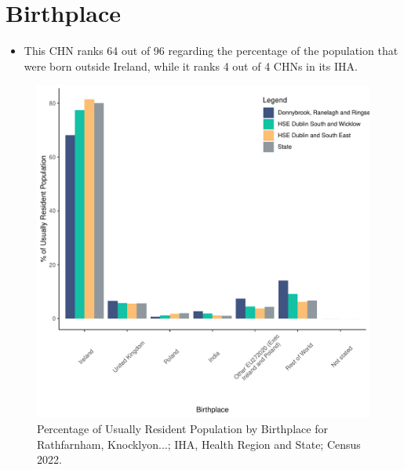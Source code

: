 \documentclass{article}
\begin{document}
\section{Birthplace}\label{sect:Birth}
\begin{itemize}
\item This CHN ranks  64 out of 96 regarding the percentage of the population that were born outside Ireland, while it ranks  4 out of 4 CHNs in its IHA.
\end{itemize}
\begin{figure}[H]
	\centering
	\includegraphics[width = 130mm]{../figures/BirthED.pdf}
	\caption{Percentage of Usually Resident Population by Birthplace for Rathfarnham, Knocklyon...; IHA, Health Region and State; Census 2022.}
	\label{fig:vbnv}
	\end{figure}
	
\end{document}
